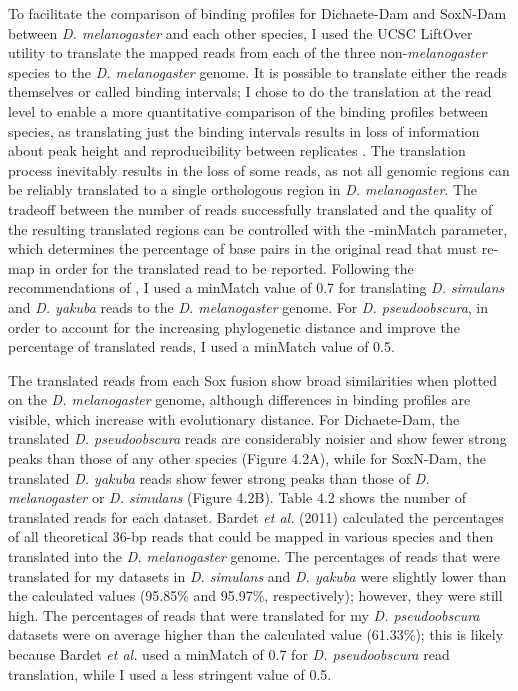 To facilitate the comparison of binding profiles for Dichaete-Dam and SoxN-Dam between \emph{D. melanogaster} and each other species, I used the UCSC LiftOver utility to translate the mapped reads from each of the three non-\emph{melanogaster} species to the \emph{D. melanogaster} genome. It is possible to translate either the reads themselves or called binding intervals; I chose to do the translation at the read level to enable a more quantitative comparison of the binding profiles between species, as translating just the binding intervals results in loss of information about peak height and reproducibility between replicates \citep{bardet_computational_2011}. The translation process inevitably results in the loss of some reads, as not all genomic regions can be reliably translated to a single orthologous region in \emph{D. melanogaster}. The tradeoff between the number of reads successfully translated and the quality of the resulting translated regions can be controlled with the -minMatch parameter, which determines the percentage of base pairs in the original read that must re-map in order for the translated read to be reported. Following the recommendations of \citet{bardet_computational_2011}, I used a minMatch value of 0.7 for translating \emph{D. simulans} and \emph{D. yakuba} reads to the \emph{D. melanogaster} genome. For \emph{D. pseudoobscura}, in order to account for the increasing phylogenetic distance and improve the percentage of translated reads, I used a minMatch value of 0.5.

The translated reads from each Sox fusion show broad similarities when plotted on the \emph{D. melanogaster} genome, although differences in binding profiles are visible, which increase with evolutionary distance. For Dichaete-Dam, the translated \emph{D. pseudoobscura} reads are considerably noisier and show fewer strong peaks than those of any other species (Figure 4.2A), while for SoxN-Dam, the translated \emph{D. yakuba} reads show fewer strong peaks than those of \emph{D. melanogaster} or \emph{D. simulans} (Figure 4.2B). Table 4.2 shows the number of translated reads for each dataset. Bardet \emph{et al.} (2011) calculated the percentages of all theoretical 36-bp reads that could be mapped in various species and then translated into the \emph{D. melanogaster} genome. The percentages of reads that were translated for my datasets in \emph{D. simulans} and \emph{D. yakuba} were slightly lower than the calculated values (95.85\% and 95.97\%, respectively); however, they were still high. The percentages of reads that were translated for my \emph{D. pseudoobscura} datasets were on average higher than the calculated value (61.33\%); this is likely because Bardet \emph{et al.} used a minMatch of 0.7 for \emph{D. pseudoobscura} read translation, while I used a less stringent value of 0.5.

